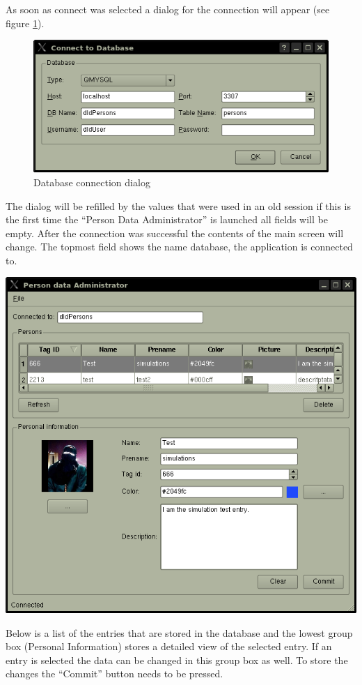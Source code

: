   As soon as connect was selected a dialog for the connection will appear (see figure \ref{fg:userManual:pdAdmin:connectDialog}).
  \begin{figure}[h]
   \centering
     \includegraphics{images/UserManual/pdAdmin/connectDialog.png}
     \caption{Database connection dialog}
     \label{fg:userManual:pdAdmin:connectDialog}
  \end{figure}
  The dialog will be refilled by the values that were used in an old session if this is the first time the ``Person Data Administrator'' is launched all fields will be empty. After the connection was successful the contents of the main screen will change. The topmost field shows the name database, the application is connected to.
  \begin{staticFigure}
   \begin{center}
     \includegraphics[scale=0.8]{images/UserManual/pdAdmin/mainSelectedEntry.png}
     \caption{Main screen with selected entry}
     \label{fg:userManual:pdAdmin:mainSelectedEntry}
   \end{center}
  \end{staticFigure}
  Below is a list of the entries that are stored in the database and the lowest group box (Personal Information) stores a detailed view of the selected entry. If an entry is selected the data can be changed in this group box as well. To store the changes the ``Commit'' button needs to be pressed.

